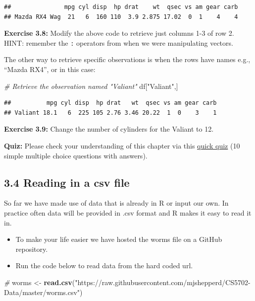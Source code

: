 \documentclass[
]{article}
\newenvironment{Shaded}{\begin{snugshade}}{\end{snugshade}}
\newcommand{\CommentTok}[1]{\textcolor[rgb]{0.56,0.35,0.01}{\textit{#1}}}
\newcommand{\FunctionTok}[1]{\textcolor[rgb]{0.13,0.29,0.53}{\textbf{#1}}}
\newcommand{\NormalTok}[1]{#1}
\newcommand{\OtherTok}[1]{\textcolor[rgb]{0.56,0.35,0.01}{#1}}
\newcommand{\StringTok}[1]{\textcolor[rgb]{0.31,0.60,0.02}{#1}}
\providecommand{\tightlist}{%
  \setlength{\itemsep}{0pt}\setlength{\parskip}{0pt}}
\begin{document}
\begin{verbatim}
##               mpg cyl disp  hp drat    wt  qsec vs am gear carb
## Mazda RX4 Wag  21   6  160 110  3.9 2.875 17.02  0  1    4    4
\end{verbatim}

\textbf{Exercise 3.8:} Modify the above code to retrieve just columns
1-3 of row 2. HINT: remember the \texttt{:} operators from when we were
manipulating vectors.

The other way to retrieve specific observations is when the rows have
names e.g., ``Mazda RX4'', or in this case:

\begin{Shaded}
\begin{Highlighting}[]
\CommentTok{\# Retrieve the observation named "Valiant"}
\NormalTok{df[}\StringTok{"Valiant"}\NormalTok{,]}
\end{Highlighting}
\end{Shaded}

\begin{verbatim}
##          mpg cyl disp  hp drat   wt  qsec vs am gear carb
## Valiant 18.1   6  225 105 2.76 3.46 20.22  1  0    3    1
\end{verbatim}

\textbf{Exercise 3.9:} Change the number of cylinders for the Valiant to
12.

\textbf{Quiz:} Please check your understanding of this chapter via this
\href{https://forms.gle/m6J1ka6LECvaDKGu5}{quick quiz} (10 simple
multiple choice questions with answers).

\subsection{3.4 Reading in a csv file}\label{WS_ReadingCSV}

So far we have made use of data that is already in R or input our own.
In practice often data will be provided in .csv format and R makes it
easy to read it in.

\begin{itemize}
\tightlist
\item
  To make your life easier we have hosted the worms file on a GitHub
  repository.\\
\item
  Run the code below to read data from the hard coded url.
\end{itemize}

\begin{Shaded}
\begin{Highlighting}[]
\CommentTok{\#}
\NormalTok{worms }\OtherTok{\textless{}{-}} \FunctionTok{read.csv}\NormalTok{(}\StringTok{"https://raw.githubusercontent.com/mjshepperd/CS5702{-}Data/master/worms.csv"}\NormalTok{)}
\end{Highlighting}
\end{Shaded}
\end{document}
